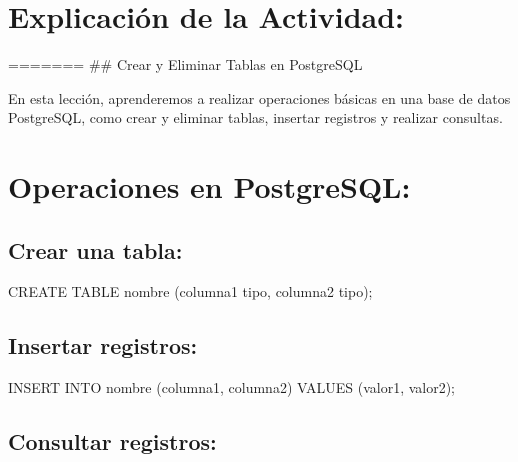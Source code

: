 \documentclass[
  a4paper,
  onepage,
  openany]{scrreprt}
\newenvironment{Shaded}{\begin{snugshade}}{\end{snugshade}}
\newcommand{\KeywordTok}[1]{\textcolor[rgb]{0.00,0.23,0.31}{#1}}
\newcommand{\NormalTok}[1]{\textcolor[rgb]{0.00,0.23,0.31}{#1}}
\begin{document}
\hypertarget{explicaciuxf3n-de-la-actividad-74}{%
\section{Explicación de la
Actividad:}\label{explicaciuxf3n-de-la-actividad-74}}

======= \#\# Crear y Eliminar Tablas en PostgreSQL

En esta lección, aprenderemos a realizar operaciones básicas en una base
de datos PostgreSQL, como crear y eliminar tablas, insertar registros y
realizar consultas.

\hypertarget{operaciones-en-postgresql-1}{%
\section{Operaciones en PostgreSQL:}\label{operaciones-en-postgresql-1}}

\hypertarget{crear-una-tabla-5}{%
\subsection{Crear una tabla:}\label{crear-una-tabla-5}}

\begin{Shaded}
\begin{Highlighting}[]
\KeywordTok{CREATE} \KeywordTok{TABLE}\NormalTok{ nombre (columna1 tipo, columna2 tipo);}
\end{Highlighting}
\end{Shaded}

\hypertarget{insertar-registros-5}{%
\subsection{Insertar registros:}\label{insertar-registros-5}}

\begin{Shaded}
\begin{Highlighting}[]
\KeywordTok{INSERT} \KeywordTok{INTO}\NormalTok{ nombre (columna1, columna2) }\KeywordTok{VALUES}\NormalTok{ (valor1, valor2);}
\end{Highlighting}
\end{Shaded}

\hypertarget{consultar-registros-5}{%
\subsection{Consultar registros:}\label{consultar-registros-5}}
\end{document}
